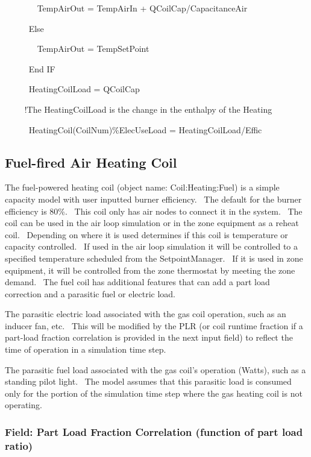 ~~~~~~~ TempAirOut = TempAirIn + QCoilCap/CapacitanceAir

~~~~~ Else

~~~~~~~ TempAirOut = TempSetPoint

~~~~~ End IF

~~~~~ HeatingCoilLoad = QCoilCap

~~~~ !The HeatingCoilLoad is the change in the enthalpy of the Heating

~~~~~ HeatingCoil(CoilNum)\%ElecUseLoad = HeatingCoilLoad/Effic

\subsection{Fuel-fired Air Heating Coil}\label{gas-air-heating-coil}

The fuel-powered heating coil (object name: Coil:Heating:Fuel) is a simple capacity model with user inputted burner efficiency.~ The default for the burner efficiency is 80\%.~ This coil only has air nodes to connect it in the system.~ The coil can be used in the air loop simulation or in the zone equipment as a reheat coil.~ Depending on where it is used determines if this coil is temperature or capacity controlled.~ If used in the air loop simulation it will be controlled to a specified temperature scheduled from the SetpointManager.~ If it is used in zone equipment, it will be controlled from the zone thermostat by meeting the zone demand.~ The fuel coil has additional features that can add a part load correction and a parasitic fuel or electric load.

The parasitic electric load associated with the gas coil operation, such as an inducer fan, etc.~ This will be modified by the PLR (or coil runtime fraction if a part-load fraction correlation is provided in the next input field) to reflect the time of operation in a simulation time step.

The parasitic fuel load associated with the gas coil's operation (Watts), such as a standing pilot light.~ The model assumes that this parasitic load is consumed only for the portion of the simulation time step where the gas heating coil is not operating.

\subsubsection{Field: Part Load Fraction Correlation (function of part load ratio)}\label{field-part-load-fraction-correlation-function-of-part-load-ratio}

